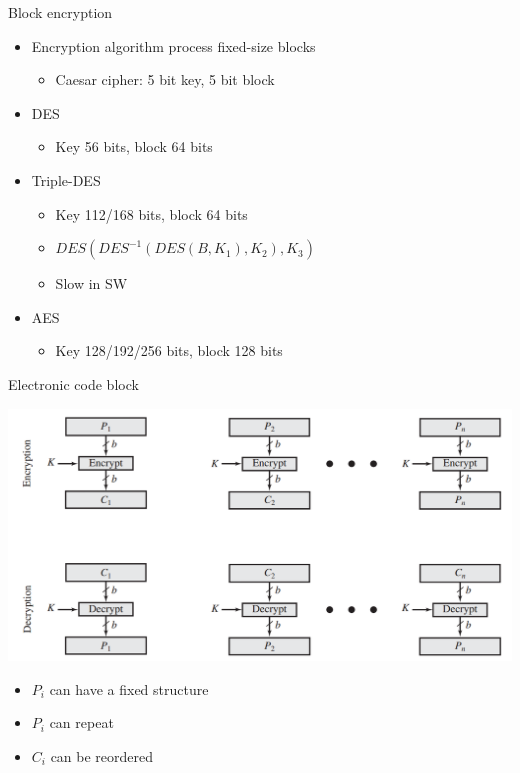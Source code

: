 \documentclass{beamer}
\begin{document}
\begin{frame}{Block encryption}
  \begin{itemize}
  \item Encryption algorithm process fixed-size blocks
    \begin{itemize}
      \item Caesar cipher: 5 bit key, 5 bit block
    \end{itemize}
  \item<2-> DES
    \begin{itemize}
      \item Key 56 bits, block 64 bits
    \end{itemize}
  \item<3-> Triple-DES
    \begin{itemize}
    \item Key 112/168 bits, block 64 bits
    \item $DES(DES^{-1}(DES(B,K_1), K_2), K_3)$
    \item Slow in SW
    \end{itemize}
  \item<4-> AES
    \begin{itemize}
    \item Key 128/192/256 bits, block 128 bits
    \end{itemize}
  \end{itemize}
\end{frame}

\begin{frame}[t]{Electronic code block}
  \begin{center}
    \includegraphics[width=0.7\linewidth]{ECB}
  \end{center}
  \begin{itemize}
  \item<2-> $P_i$ can have a fixed structure
  \item <3-> $P_i$ can repeat
  \item <4-> $C_i$ can be reordered
  \end{itemize}
\end{frame}
\end{document}
